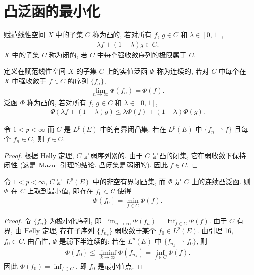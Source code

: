 \documentclass[../../main.tex]{subfiles}
\begin{document}
\section{凸泛函的最小化}\label{section:ch08-凸泛函最小化}

\begin{definition}[凸集与闭集]\label{definition:ch08-凸集闭集}
赋范线性空间 $X$ 中的子集 $C$ 称为凸的, 若对所有 $f$, $g\in C$ 和 $\lambda\in[0,1]$,
\begin{align*}
\lambda f+(1-\lambda)g\in C.
\end{align*}
$X$ 中的子集 $C$ 称为闭的, 若 $C$ 中每个强收敛序列的极限属于 $C$.
\end{definition}

\begin{definition}[连续与凸泛函]\label{definition:ch08-连续凸泛函}
定义在赋范线性空间 $X$ 的子集 $C$ 上的实值泛函 $\Phi$ 称为连续的, 若对 $C$ 中每个在 $X$ 中强收敛于 $f\in C$ 的序列 $\{f_{n}\}$,
\begin{align*}
\lim_{n\to\infty}\Phi(f_{n})=\Phi(f).
\end{align*}
泛函 $\Phi$ 称为凸的, 若对所有 $f$, $g\in C$ 和 $\lambda\in[0,1]$,
\begin{align*}
\Phi(\lambda f+(1-\lambda)g)\leqslant\lambda\Phi(f)+(1-\lambda)\Phi(g).
\end{align*}
\end{definition}

\begin{lemma}\label{lemma:ch08-弱收敛极限属于凸闭集}
令 $1<p<\infty$ 而 $C$ 是 $L^{p}(E)$ 中的有界闭凸集. 若在 $L^{p}(E)$ 中 $\{f_{n}\rightharpoonup f\}$ 且每个 $f_{n}\in C$, 则 $f\in C$.
\end{lemma}

\begin{proof}
根据 Helly 定理, $C$ 是弱序列紧的. 由于 $C$ 是凸的闭集, 它在弱收敛下保持闭性 (这是 Mazur 引理的结论: 凸闭集是弱闭的). 因此 $f\in C$.
\end{proof}

\begin{theorem}[凸泛函最小化定理]\label{theorem:ch08-凸泛函最小化}
令 $1<p<\infty$, $C$ 是 $L^{p}(E)$ 中的非空有界闭凸集, 而 $\Phi$ 是 $C$ 上的连续凸泛函. 则 $\Phi$ 在 $C$ 上取到最小值, 即存在 $f_{0}\in C$ 使得
\begin{align*}
\Phi(f_{0})=\min_{f\in C}\Phi(f).
\end{align*}
\end{theorem}

\begin{proof}
令 $\{f_{n}\}$ 为极小化序列, 即 $\lim_{n\to\infty}\Phi(f_{n})=\inf_{f\in C}\Phi(f)$. 由于 $C$ 有界, 由 Helly 定理, 存在子序列 $\{f_{n_{k}}\}$ 弱收敛于某个 $f_{0}\in L^{p}(E)$. 由引理 16, $f_{0}\in C$. 由凸性, $\Phi$ 是弱下半连续的: 若在 $L^{p}(E)$ 中 $\{f_{n_{k}}\rightharpoonup f_{0}\}$, 则
\begin{align*}
\Phi(f_{0})\leqslant\liminf_{k\to\infty}\Phi(f_{n_{k}})=\inf_{f\in C}\Phi(f).
\end{align*}
因此 $\Phi(f_{0})=\inf_{f\in C}$, 即 $f_{0}$ 是最小值点.
\end{proof}
\end{document}
